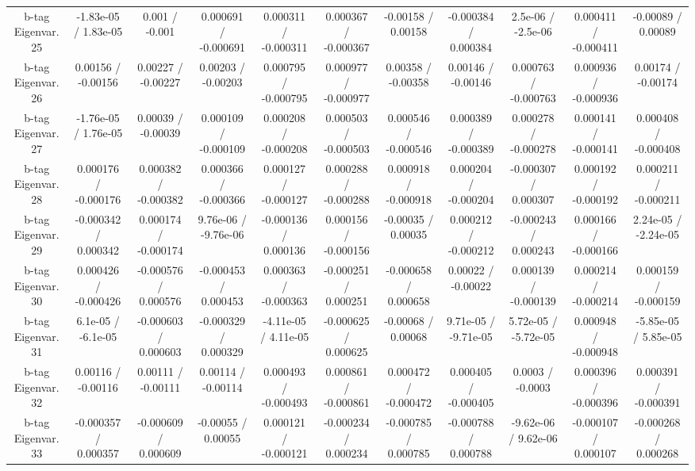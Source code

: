 {\begin{landscape}
\begin{longtable}{@{\extracolsep{\fill}}| *{11}{c|}}
  b-tag Eigenvar. 25 & -1.83e-05 / 1.83e-05 & 0.001 / -0.001 & 0.000691 / -0.000691 & 0.000311 / -0.000311 & 0.000367 / -0.000367 & -0.00158 / 0.00158 & -0.000384 / 0.000384 & 2.5e-06 / -2.5e-06 & 0.000411 / -0.000411 & -0.00089 / 0.00089 \\ 
  b-tag Eigenvar. 26 & 0.00156 / -0.00156 & 0.00227 / -0.00227 & 0.00203 / -0.00203 & 0.000795 / -0.000795 & 0.000977 / -0.000977 & 0.00358 / -0.00358 & 0.00146 / -0.00146 & 0.000763 / -0.000763 & 0.000936 / -0.000936 & 0.00174 / -0.00174 \\ 
  b-tag Eigenvar. 27 & -1.76e-05 / 1.76e-05 & 0.00039 / -0.00039 & 0.000109 / -0.000109 & 0.000208 / -0.000208 & 0.000503 / -0.000503 & 0.000546 / -0.000546 & 0.000389 / -0.000389 & 0.000278 / -0.000278 & 0.000141 / -0.000141 & 0.000408 / -0.000408 \\ 
  b-tag Eigenvar. 28 & 0.000176 / -0.000176 & 0.000382 / -0.000382 & 0.000366 / -0.000366 & 0.000127 / -0.000127 & 0.000288 / -0.000288 & 0.000918 / -0.000918 & 0.000204 / -0.000204 & -0.000307 / 0.000307 & 0.000192 / -0.000192 & 0.000211 / -0.000211 \\ 
  b-tag Eigenvar. 29 & -0.000342 / 0.000342 & 0.000174 / -0.000174 & 9.76e-06 / -9.76e-06 & -0.000136 / 0.000136 & 0.000156 / -0.000156 & -0.00035 / 0.00035 & 0.000212 / -0.000212 & -0.000243 / 0.000243 & 0.000166 / -0.000166 & 2.24e-05 / -2.24e-05 \\ 
  b-tag Eigenvar. 30 & 0.000426 / -0.000426 & -0.000576 / 0.000576 & -0.000453 / 0.000453 & 0.000363 / -0.000363 & -0.000251 / 0.000251 & -0.000658 / 0.000658 & 0.00022 / -0.00022 & 0.000139 / -0.000139 & 0.000214 / -0.000214 & 0.000159 / -0.000159 \\ 
  b-tag Eigenvar. 31 & 6.1e-05 / -6.1e-05 & -0.000603 / 0.000603 & -0.000329 / 0.000329 & -4.11e-05 / 4.11e-05 & -0.000625 / 0.000625 & -0.00068 / 0.00068 & 9.71e-05 / -9.71e-05 & 5.72e-05 / -5.72e-05 & 0.000948 / -0.000948 & -5.85e-05 / 5.85e-05 \\ 
  b-tag Eigenvar. 32 & 0.00116 / -0.00116 & 0.00111 / -0.00111 & 0.00114 / -0.00114 & 0.000493 / -0.000493 & 0.000861 / -0.000861 & 0.000472 / -0.000472 & 0.000405 / -0.000405 & 0.0003 / -0.0003 & 0.000396 / -0.000396 & 0.000391 / -0.000391 \\ 
  b-tag Eigenvar. 33 & -0.000357 / 0.000357 & -0.000609 / 0.000609 & -0.00055 / 0.00055 & 0.000121 / -0.000121 & -0.000234 / 0.000234 & -0.000785 / 0.000785 & -0.000788 / 0.000788 & -9.62e-06 / 9.62e-06 & -0.000107 / 0.000107 & -0.000268 / 0.000268 \\ 

\end{longtable}
\end{landscape}}
